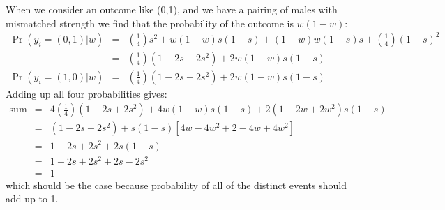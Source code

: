 \documentclass[11pt]{article}
\begin{document}
When we consider an outcome like (0,1), and we have a pairing of males with mismatched strength we find that the probability of the outcome is $w(1-w)$:
\begin{eqnarray*} 
 \Pr(y_i = (0,1)|w)  & = &   \left(\frac{1}{4}\right)s^2 + w(1-w) s(1-s)  + (1-w)w(1-s)s + \left(\frac{1}{4}\right)(1-s)^2 \\
	 & = &   \left(\frac{1}{4}\right)(1-2s +2s^2) + 2w(1-w) s(1-s) \\
\Pr(y_i = (1,0)|w)  & = &\left(\frac{1}{4}\right)(1-2s +2s^2) + 2w(1-w) s(1-s)
\end{eqnarray*}
Adding up all four probabilities gives:
\begin{eqnarray*} 
\mbox{sum} & = & 4\left(\frac{1}{4}\right)(1-2s +2s^2) + 4w(1-w) s(1-s) + 2 (1 -2w +2w^2) s(1-s)\\
& = & (1-2s +2s^2) + s(1-s)\left[4w -4w^2 + 2 -4w +4w^2\right]\\
& = & 1-2s +2s^2 + 2s(1-s)\\
& = & 1-2s +2s^2 + 2s- 2s^2\\
& = & 1
\end{eqnarray*}
which should be the case because probability of all of the distinct events should add up to 1.



\end{document}
